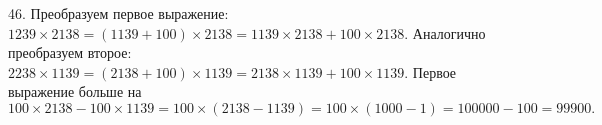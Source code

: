 46. Преобразуем первое выражение: $1239\times2138=(1139+100)\times2138=1139\times2138+100\times2138.$ Аналогично преобразуем второе:
$2238\times1139=(2138+100)\times1139=2138\times1139+100\times1139.$ Первое выражение больше на $100\times2138-100\times1139=
100\times(2138-1139)=100\times(1000-1)=100000-100=99900.$\\
